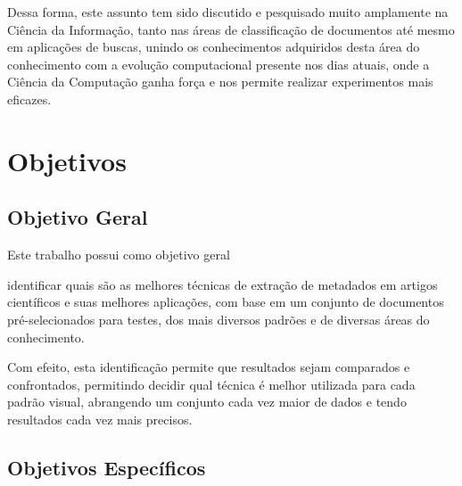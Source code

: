 \begin{textonovo}
Dessa forma, este assunto tem sido discutido e pesquisado muito amplamente na Ciência da Informação, tanto nas áreas de classificação de documentos até mesmo em aplicações de buscas, unindo os conhecimentos adquiridos desta área do conhecimento com a evolução computacional presente nos dias atuais, onde a Ciência da Computação ganha força e nos permite realizar experimentos mais eficazes.

\end{textonovo}

\section{Objetivos}


\subsection{Objetivo Geral}

Este trabalho possui como objetivo geral \begin{textoalterado}identificar quais são as melhores técnicas de extração de metadados em artigos científicos e suas melhores aplicações, com base em um conjunto de documentos pré-selecionados para testes, dos mais diversos padrões e de diversas áreas do conhecimento.

Com efeito, esta identificação permite que resultados sejam comparados e confrontados, permitindo decidir qual técnica é melhor utilizada para cada padrão visual, abrangendo um conjunto cada vez maior de dados e tendo resultados cada vez mais precisos.

\end{textoalterado}


\subsection{Objetivos Específicos}

